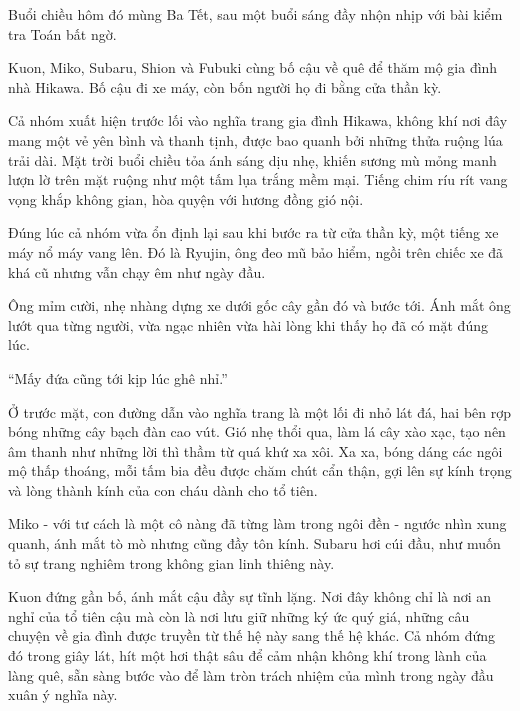 \documentclass[../main.tex]{subfiles}
\begin{document}
Buổi chiều hôm đó mùng Ba Tết, sau một buổi sáng đầy nhộn nhịp với bài kiểm tra Toán bất ngờ.

Kuon, Miko, Subaru, Shion và Fubuki cùng bố cậu về quê để thăm mộ gia đình nhà Hikawa. Bố cậu đi xe máy, còn bốn người họ đi bằng cửa thần kỳ.

Cả nhóm xuất hiện trước lối vào nghĩa trang gia đình Hikawa, không khí nơi đây mang một vẻ yên bình và thanh tịnh, được bao quanh bởi những thửa ruộng lúa trải dài. Mặt trời buổi chiều tỏa ánh sáng dịu nhẹ, khiến sương mù mỏng manh lượn lờ trên mặt ruộng như một tấm lụa trắng mềm mại. Tiếng chim ríu rít vang vọng khắp không gian, hòa quyện với hương đồng gió nội.

Đúng lúc cả nhóm vừa ổn định lại sau khi bước ra từ cửa thần kỳ, một tiếng xe máy nổ máy vang lên. Đó là Ryujin, ông đeo mũ bảo hiểm, ngồi trên chiếc xe đã khá cũ nhưng vẫn chạy êm như ngày đầu.

Ông mỉm cười, nhẹ nhàng dựng xe dưới gốc cây gần đó và bước tới. Ánh mắt ông lướt qua từng người, vừa ngạc nhiên vừa hài lòng khi thấy họ đã có mặt đúng lúc.

``Mấy đứa cũng tới kịp lúc ghê nhỉ.''

Ở trước mặt, con đường dẫn vào nghĩa trang là một lối đi nhỏ lát đá, hai bên rợp bóng những cây bạch đàn cao vút. Gió nhẹ thổi qua, làm lá cây xào xạc, tạo nên âm thanh như những lời thì thầm từ quá khứ xa xôi. Xa xa, bóng dáng các ngôi mộ thấp thoáng, mỗi tấm bia đều được chăm chút cẩn thận, gợi lên sự kính trọng và lòng thành kính của con cháu dành cho tổ tiên.

Miko - với tư cách là một cô nàng đã từng làm trong ngôi đền - ngước nhìn xung quanh, ánh mắt tò mò nhưng cũng đầy tôn kính. Subaru hơi cúi đầu, như muốn tỏ sự trang nghiêm trong không gian linh thiêng này.

Kuon đứng gần bố, ánh mắt cậu đầy sự tĩnh lặng. Nơi đây không chỉ là nơi an nghỉ của tổ tiên cậu mà còn là nơi lưu giữ những ký ức quý giá, những câu chuyện về gia đình được truyền từ thế hệ này sang thế hệ khác. Cả nhóm đứng đó trong giây lát, hít một hơi thật sâu để cảm nhận không khí trong lành của làng quê, sẵn sàng bước vào để làm tròn trách nhiệm của mình trong ngày đầu xuân ý nghĩa này.
\end{document}
